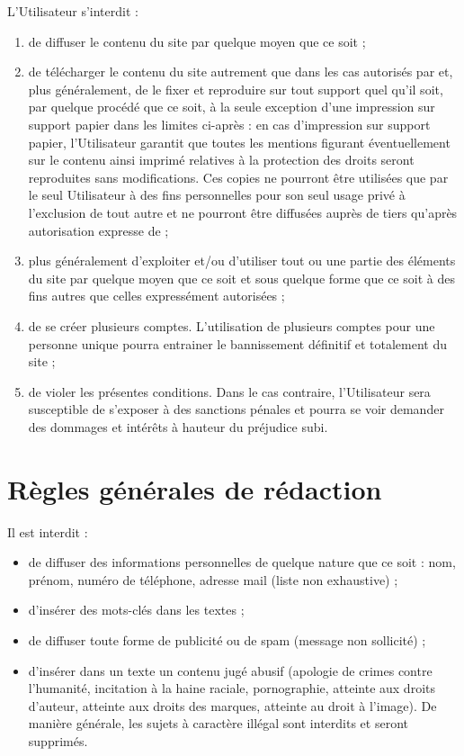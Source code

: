 L'Utilisateur s'interdit :
\begin{enumerate}
   \item de diffuser le contenu du site par quelque moyen que ce soit ;
   \item de télécharger le contenu du site autrement que dans les cas autorisés par \eDevoir et, plus généralement, de le fixer et reproduire sur tout support quel qu'il soit, par quelque procédé que ce soit, à la seule exception d'une impression sur support papier dans les limites ci-après : en cas d'impression sur support papier, l'Utilisateur garantit que toutes les mentions figurant éventuellement sur le contenu ainsi imprimé relatives à la protection des droits seront reproduites sans modifications. Ces copies ne pourront être utilisées que par le seul Utilisateur à des fins personnelles pour son seul usage privé à l'exclusion de tout autre et ne pourront être diffusées auprès de tiers qu'après autorisation expresse de \eDevoir ;
   \item plus généralement d'exploiter et/ou d'utiliser tout ou une partie des éléments du site par quelque moyen que ce soit et sous quelque forme que ce soit à des fins autres que celles expressément autorisées ;
   \item de se créer plusieurs comptes. L'utilisation de plusieurs comptes pour une personne unique pourra entrainer le bannissement définitif et totalement du site ;
   \item de violer les présentes conditions. Dans le cas contraire, l'Utilisateur sera susceptible de s'exposer à des sanctions pénales et pourra se voir demander des dommages et intérêts à hauteur du préjudice subi.
\end{enumerate}


\section{Règles générales de rédaction}

Il est interdit :
\begin{itemize}
  \item de diffuser des informations personnelles de quelque nature que ce soit : nom, prénom, numéro de téléphone, adresse mail (liste non exhaustive) ;
  \item d'insérer des mots-clés dans les textes ;
  \item de diffuser toute forme de publicité ou de spam (message non sollicité) ;
  \item d'insérer dans un texte un contenu jugé abusif (apologie de crimes contre l'humanité, incitation à la haine raciale, pornographie, atteinte aux droits d'auteur, atteinte aux droits des marques, atteinte au droit à l'image). De manière générale, les sujets à caractère illégal sont interdits et seront supprimés.
\end{itemize}

